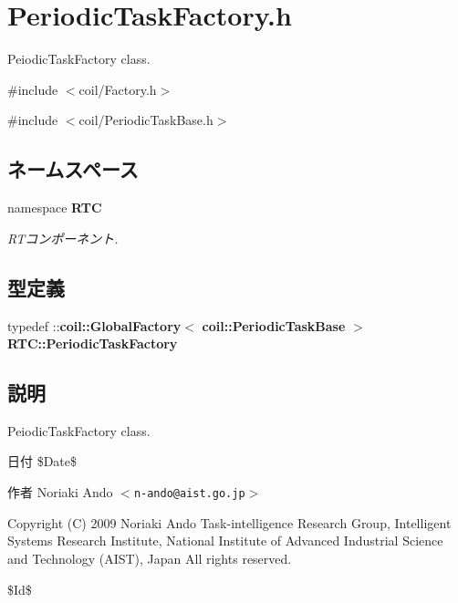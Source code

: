 \section{PeriodicTaskFactory.h}
\label{PeriodicTaskFactory_8h}


PeiodicTaskFactory class.  


{\ttfamily \#include $<$coil/Factory.h$>$}\par
{\ttfamily \#include $<$coil/PeriodicTaskBase.h$>$}\par
\subsection*{ネームスペース}
\begin{DoxyCompactItemize}
\item 
namespace {\bf RTC}


\begin{DoxyCompactList}\small\item\em RTコンポーネント. \item\end{DoxyCompactList}

\end{DoxyCompactItemize}
\subsection*{型定義}
\begin{DoxyCompactItemize}
\item 
typedef ::{\bf coil::GlobalFactory}$<$ {\bf coil::PeriodicTaskBase} $>$ {\bf RTC::PeriodicTaskFactory}
\end{DoxyCompactItemize}


\subsection{説明}
PeiodicTaskFactory class. \begin{DoxyDate}{日付}
\$Date\$ 
\end{DoxyDate}
\begin{DoxyAuthor}{作者}
Noriaki Ando $<${\tt n-\/ando@aist.go.jp}$>$
\end{DoxyAuthor}
Copyright (C) 2009 Noriaki Ando Task-\/intelligence Research Group, Intelligent Systems Research Institute, National Institute of Advanced Industrial Science and Technology (AIST), Japan All rights reserved.

\$Id\$ 